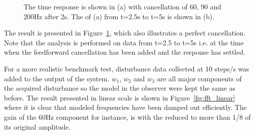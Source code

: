 \begin{figure}[h!]
  \centering %
  \qquad
  \caption{\label{fig:3_dist_both} The time response is shown in (a) with cancellation of 60, 90 and 200Hz after 2s. The \abbrFFT of (a) from t=2.5s to t=5s is shown in (b).}
\end{figure}

The result is presented in Figure~\ref{fig:3_dist_both}, which also illustrates a perfect cancellation. Note that the \abbrFFT analysis is performed on data from t=2.5 to t=5s i.e. at the time when the feedforward cancellation has been added and the response has settled.

For a more realistic benchmark test, disturbance data collected at 10 steps/s was added to the output of the system. $w_1$, $w_2$ and $w_3$ are all major components of the acquired disturbance so the model in the observer were kept the same as before. The result presented in linear scale is shown in Figure~\ref{fig:fft_linear} where it is clear that modeled frequencies have been damped out efficiently. The gain of the 60Hz component for instance, is with the \abbrRFDC reduced to more than 1/8 of its original amplitude.

